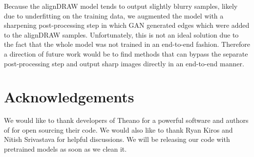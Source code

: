 \documentclass{article} %
\begin{document}
Because the alignDRAW model tends to output slightly blurry samples, likely due to underfitting on the training data, we augmented the model with a sharpening post-processing step in which GAN generated edges which were added to the alignDRAW samples. Unfortunately, this is not an ideal solution due to the fact that the whole model was not trained in an end-to-end fashion. Therefore a direction of future work would be to find methods that can bypass the separate post-processing step and output sharp images directly in an end-to-end manner. 

\newpage
\section{Acknowledgements}
We would like to thank developers of Theano \citep{theano} for a powerful software and authors of \citep{denton_lapgan} for open sourcing their code. We would also like to thank Ryan Kiros and Nitish Srivastava for helpful discussions. We will be releasing our code with pretrained models as soon as we clean it.




\newpage
\appendix

\end{document}
